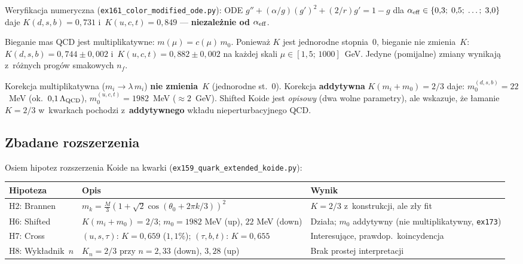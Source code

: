 \noindent
Weryfikacja numeryczna (\texttt{ex161\_color\_modified\_ode.py}):
ODE $g'' + (\alpha/g)(g')^2 + (2/r)g' = 1-g$
dla $\alpha_{\rm eff} \in \{0{,}3;\; 0{,}5;\; \ldots;\; 3{,}0\}$
daje $K(d,s,b) = 0{,}731$ i~$K(u,c,t) = 0{,}849$ ---
\textbf{niezale\.znie od $\alpha_{\rm eff}$}.

\begin{result}%
\label{res:X-K-RGE}
Bieganie mas QCD jest multiplikatywne: $m(\mu) = c(\mu)\,m_0$.
Poniewa\.z $K$ jest jednorodne stopnia~$0$, bieganie
nie zmienia~$K$: $K(d,s,b) = 0{,}744 \pm 0{,}002$
i~$K(u,c,t) = 0{,}882 \pm 0{,}002$ na ka\.zdej
skali $\mu \in [1{,}5;\, 1000]$~GeV.
Jedyne (pomijalne) zmiany wynikaj\k{a} z~r\'o\.znych
prog\'ow smakowych $n_f$.
\end{result}

\begin{remark}%
\label{rem:X-shifted-koide}
Korekcja multiplikatywna ($m_i \to \lambda\,m_i$) \textbf{nie zmienia}~$K$
(jednorodne st.~$0$).
Korekcja \textbf{addytywna} $K(m_i + m_0) = 2/3$ daje:
$m_0^{(d,s,b)} = 22$~MeV (ok.\ $0{,}1\,\Lambda_{\rm QCD}$),
$m_0^{(u,c,t)} = 1982$~MeV ($\approx 2$~GeV).
Shifted Koide jest \emph{opisowy} (dwa wolne parametry),
ale wskazuje, \.ze \l{}amanie $K = 2/3$ w~kwarkach
pochodzi z~\textbf{addytywnego} wk\l{}adu nieperturbacyjnego QCD.
\end{remark}

\subsection{Zbadane rozszerzenia}\label{app:X-rozszerzenia}

\noindent
Osiem hipotez rozszerzenia Koide na kwarki
(\texttt{ex159\_quark\_extended\_koide.py}):

\begin{center}\footnotesize
\begin{tabular}{@{}lp{5.8cm}l@{}}
\toprule
  Hipoteza & Opis & Wynik \\
\midrule
  H2: Brannen & $m_k = \tfrac{M}{3}(1+\sqrt{2}\cos(\theta_0 + 2\pi k/3))^2$
    & $K = 2/3$ z~konstrukcji, ale z\l{}y fit \\
  H6: Shifted & $K(m_i + m_0) = 2/3$; $m_0 = 1982$ MeV (up), $22$ MeV (down)
    & Dzia\l{}a; $m_0$ addytywny (nie multiplikatywny, \texttt{ex173}) \\
  H7: Cross & $(u, s, \tau)$: $K = 0{,}659$ ($1{,}1\%$); $(\tau, b, t)$: $K = 0{,}655$
    & Interesuj\k{a}ce, prawdop.\ koincydencja \\
  H8: Wyk\l{}adnik~$n$ & $K_n = 2/3$ przy $n = 2{,}33$ (down), $3{,}28$ (up)
    & Brak prostej interpretacji \\
\bottomrule
\end{tabular}
\end{center}

